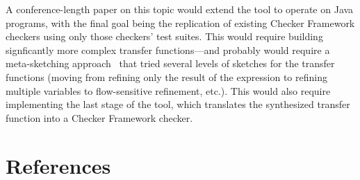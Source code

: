 \documentclass[10pt,conference]{IEEEtran}
\begin{document}
A conference-length paper on this topic would extend the tool to operate
on Java programs, with the final goal being the replication of
existing Checker Framework checkers using only those checkers'
test suites. This would require building signficantly more
complex transfer functions---and probably would require
a meta-sketching approach~\cite{metasketching} that tried several levels of
sketches for the transfer functions (moving from
refining only the result of the expression to
refining multiple variables to flow-sensitive refinement, etc.).
This would also require implementing the last stage of the tool, which
translates the synthesized transfer function into a Checker Framework
checker.

\section{References}

\begingroup
\renewcommand{\section}[2]{}%



%
%
\endgroup
\end{document}

